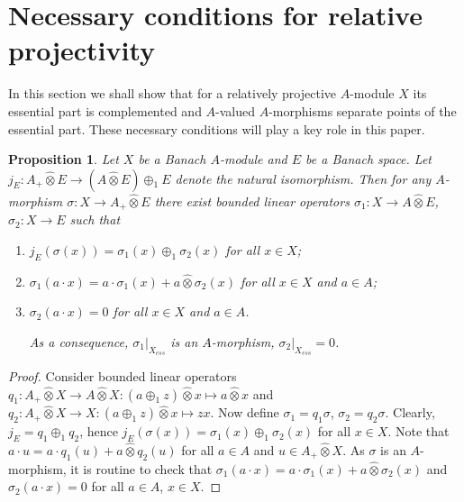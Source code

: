 \documentclass[12pt]{article}
\newtheorem{proposition}[theorem]{Proposition}
\newcommand{\projtens}{\mathbin{\widehat{\otimes}}}
\begin{document}

\section{Necessary conditions for relative
  projectivity}\label{NecessaryConditions}

In this section we shall show that for a relatively projective $A$-module $X$
its essential part is complemented and $A$-valued $A$-morphisms separate points
of the essential part. These necessary conditions will play a key role in this
paper.

\begin{proposition}\label{MorphDecomp} Let $X$ be a Banach $A$-module and $E$ be
    a Banach space. Let $j_E:A_+\projtens E\to (A\projtens E)\oplus_1 E$ denote
    the natural isomorphism. Then for any $A$-morphism $\sigma:X\to A_+\projtens
        E$ there exist bounded linear operators $\sigma_1:X\to A\projtens E$,
    $\sigma_2:X\to E$ such that

    \begin{enumerate}[label = (\roman*)]
        \item $j_E(\sigma(x))=\sigma_1(x)\oplus_1 \sigma_2(x)$ for all $x\in X$;
        \item $\sigma_1(a\cdot x)=a\cdot \sigma_1(x)+a\projtens \sigma_2(x)$ for
              all $x\in X$ and $a\in A$;
        \item $\sigma_2(a\cdot x)=0$ for all $x\in X$ and $a\in A$.

              \noindent
              As a consequence, $\sigma_1|_{X_{ess}}$ is an $A$-morphism,
              $\sigma_2|_{X_{ess}}=0$.
    \end{enumerate}
\end{proposition}
\begin{proof} Consider bounded linear operators $q_1:A_+\projtens X\to
        A\projtens X: (a\oplus_1 z)\projtens x\mapsto a\projtens x$ and
    $q_2:A_+\projtens X\to X: (a\oplus_1 z)\projtens x\mapsto z x$. Now
    define $\sigma_1=q_1\sigma$, $\sigma_2=q_2\sigma$. Clearly,
    $j_E=q_1\oplus_1 q_2$, hence $j_E(\sigma(x))=\sigma_1(x)\oplus_1
        \sigma_2(x)$ for all $x\in X$. Note that $a\cdot u=a\cdot
        q_1(u)+a\projtens q_2(u)$ for all $a\in A$ and $u\in A_+\projtens X$. As
    $\sigma$ is an $A$-morphism, it is routine to check that
    $\sigma_1(a\cdot x)=a\cdot \sigma_1(x)+a\projtens \sigma_2(x)$ and
    $\sigma_2(a\cdot x)=0$ for all $a\in A$, $x\in X$.
\end{proof}
\end{document}
